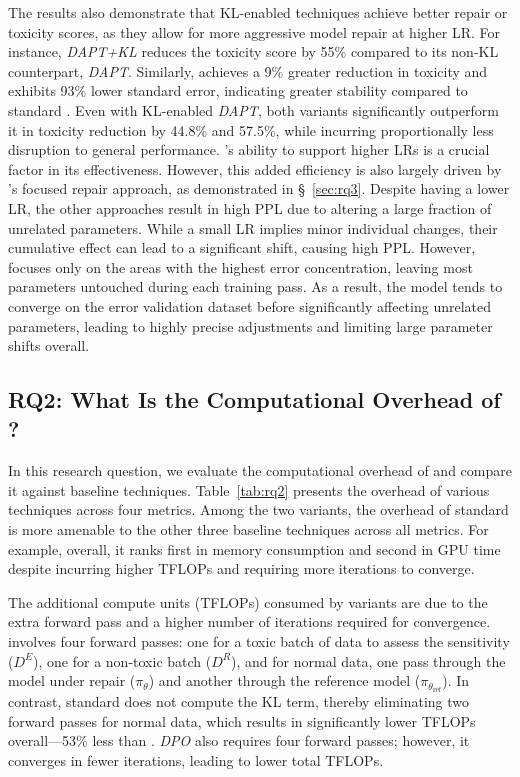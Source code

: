 The results also demonstrate that KL-enabled techniques achieve better repair or toxicity scores, as they allow for more aggressive model repair at higher LR. For instance, \textit{DAPT+KL} reduces the toxicity score by 55\% compared to its non-KL counterpart, \textit{DAPT}. Similarly, \nickkl achieves a 9\% greater reduction in toxicity and exhibits 93\% lower standard error, indicating greater stability compared to standard \nick. Even with KL-enabled \textit{DAPT}, both \nick variants significantly outperform it in toxicity reduction by 44.8\% and 57.5\%, while incurring proportionally less disruption to general performance. \nick's ability to support higher LRs is a crucial factor in its effectiveness. However, this added efficiency is also largely driven by \nick's focused repair approach, as demonstrated in \S~\ref{sec:rq3}. Despite having a lower LR, the other approaches result in high PPL due to altering a large fraction of unrelated parameters. While a small LR implies minor individual changes, their cumulative effect can lead to a significant shift, causing high PPL. However, \nick focuses only on the areas with the highest error concentration, leaving most parameters untouched during each training pass. As a result, the model tends to converge 
on the error validation dataset before significantly affecting unrelated parameters, leading to highly precise adjustments and limiting large parameter shifts overall.




\subsection{RQ2: What Is the Computational Overhead of \nick?}
\label{sec:rq2}

In this research question, we evaluate the computational overhead of \nick and compare it against baseline techniques. Table~\ref{tab:rq2} presents the overhead of various techniques across four metrics. Among the two \nick variants, the overhead of standard \nick is more amenable to the other three baseline techniques across all metrics. For example, overall, it ranks first in memory consumption and second in GPU time despite incurring higher TFLOPs and requiring more iterations to converge.

The additional compute units (TFLOPs) consumed by \nick variants are due to the extra forward pass and a higher number of iterations required for convergence. \nickkl involves four forward passes: one for a toxic batch of data to assess the sensitivity ($D^E$), one for a non-toxic batch ($D^R$), and for normal data, one pass through the model under repair ($\pi_\theta$) and another through the reference model ($\pi_{\theta_{\text{ref}}}$). In contrast, standard \nick does not compute the KL term, thereby eliminating two forward passes for normal data, which results in significantly lower TFLOPs overall—53\% less than \nickkl. \textit{DPO} also requires four forward passes; however, it converges in fewer iterations, leading to lower total TFLOPs.

